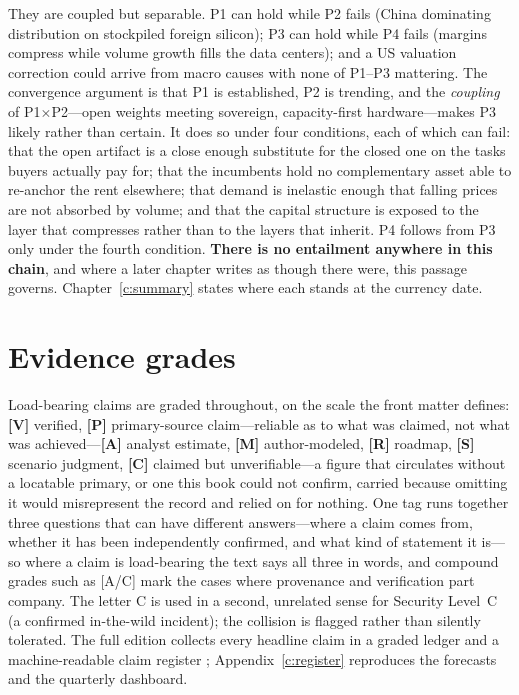 They are coupled but separable. P1 can hold while P2 fails (China dominating distribution on stockpiled foreign silicon); P3 can hold while P4 fails (margins compress while volume growth fills the data centers); and a US valuation correction could arrive from macro causes with none of P1--P3 mattering. The convergence argument is that P1 is established, P2 is trending, and the \emph{coupling} of P1$\times$P2---open weights meeting sovereign, capacity-first hardware---makes P3 likely rather than certain. It does so under four conditions, each of which can fail: that the open artifact is a close enough substitute for the closed one on the tasks buyers actually pay for; that the incumbents hold no complementary asset able to re-anchor the rent elsewhere; that demand is inelastic enough that falling prices are not absorbed by volume; and that the capital structure is exposed to the layer that compresses rather than to the layers that inherit. P4 follows from P3 only under the fourth condition. \textbf{There is no entailment anywhere in this chain}, and where a later chapter writes as though there were, this passage governs. Chapter~\ref{c:summary} states where each stands at the currency date.

\section{Evidence grades}

Load-bearing claims are graded throughout, on the scale the front matter defines: \textbf{[V]} verified, \textbf{[P]} primary-source claim---reliable as to what was claimed, not what was achieved---\textbf{[A]} analyst estimate, \textbf{[M]} author-modeled, \textbf{[R]} roadmap, \textbf{[S]} scenario judgment, \textbf{[C]} claimed but unverifiable---a figure that circulates without a locatable primary, or one this book could not confirm, carried because omitting it would misrepresent the record and relied on for nothing. One tag runs together three questions that can have different answers---where a claim comes from, whether it has been independently confirmed, and what kind of statement it is---so where a claim is load-bearing the text says all three in words, and compound grades such as [A/C] mark the cases where provenance and verification part company. The letter C is used in a second, unrelated sense for Security Level~C (a confirmed in-the-wild incident); the collision is flagged rather than silently tolerated. The full edition collects every headline claim in a graded ledger and a machine-readable claim register ; Appendix~\ref{c:register} reproduces the forecasts and the quarterly dashboard.


